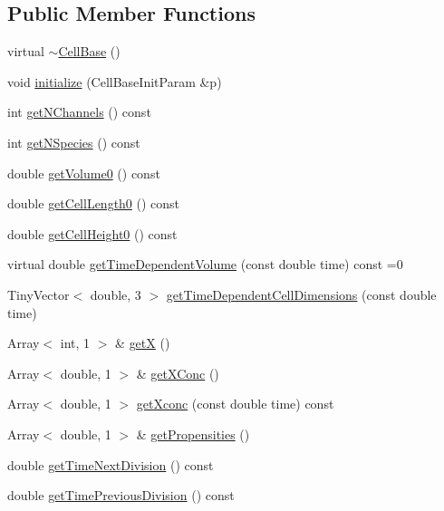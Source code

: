 \subsection*{\-Public \-Member \-Functions}
\begin{DoxyCompactItemize}
\item 
virtual \hyperlink{class_cell_base_a91df7ce6090723939914fc08ae5dd25e}{$\sim$\-Cell\-Base} ()
\item 
void \hyperlink{class_cell_base_a442489e1986f767c2a0530c01a134057}{initialize} (\-Cell\-Base\-Init\-Param \&p)
\item 
int \hyperlink{class_cell_base_ac63ef2dae0215b9fb430dcc40378f2ce}{get\-N\-Channels} () const 
\item 
int \hyperlink{class_cell_base_a870a19609d2b3910a4893be9d29799be}{get\-N\-Species} () const 
\item 
double \hyperlink{class_cell_base_a4ef31e07bbd457ce98bd354ffca1154e}{get\-Volume0} () const 
\item 
double \hyperlink{class_cell_base_a359d654fd26a50c59ad8eb37bdd3d0fd}{get\-Cell\-Length0} () const 
\item 
double \hyperlink{class_cell_base_a2c2d7a9f7729aff66186a69682c537b6}{get\-Cell\-Height0} () const 
\item 
virtual double \hyperlink{class_cell_base_a7b69eec41c172b719e7f2ea6cb277ce9}{get\-Time\-Dependent\-Volume} (const double time) const =0
\item 
\-Tiny\-Vector$<$ double, 3 $>$ \hyperlink{class_cell_base_a9776bb276fe4c6dc00448e5c9c6f4486}{get\-Time\-Dependent\-Cell\-Dimensions} (const double time)
\item 
\-Array$<$ int, 1 $>$ \& \hyperlink{class_cell_base_a72403c587aa2e64ba662a1f0c5ad5283}{get\-X} ()
\item 
\-Array$<$ double, 1 $>$ \& \hyperlink{class_cell_base_a12d1351b10bdacb89963176f5a576354}{get\-X\-Conc} ()
\item 
\-Array$<$ double, 1 $>$ \hyperlink{class_cell_base_a1e0fbdf9180c81c682b318d0f280ae3b}{get\-Xconc} (const double time) const 
\item 
\-Array$<$ double, 1 $>$ \& \hyperlink{class_cell_base_ad176550eea24417e8972346acb4c0640}{get\-Propensities} ()
\item 
double \hyperlink{class_cell_base_a9fe443b9b862fdafde0c05bb47b34c0a}{get\-Time\-Next\-Division} () const 
\item 
double \hyperlink{class_cell_base_a9e8640e5d32e13570bb41ef527bb66de}{get\-Time\-Previous\-Division} () const 

\end{DoxyCompactItemize}
